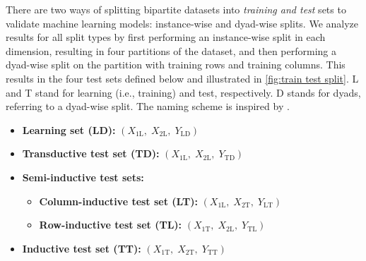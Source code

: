 \documentclass[letterpaper]{article}
\begin{document}
There are two ways of splitting bipartite datasets into \emph{training and test} sets to validate machine learning models: instance-wise and dyad-wise splits.
We analyze results for all split types by first performing an instance-wise split in each dimension, resulting in four partitions of the dataset, and then performing a dyad-wise split on the partition with training rows and training columns.
This results in the four test sets defined below and illustrated in \cref{fig:train test split}. L and T stand for learning (i.e., training) and test, respectively. D stands for dyads, referring to a dyad-wise split.
The naming scheme is inspired by \citet{schrynemackers_protocols_2013,pliakos_global_2018}.
\begin{itemize}
    \item \textbf{Learning set (LD):}
    $(X_\text{1L},\;X_\text{2L}, \;Y_\text{LD})$
    \item \textbf{Transductive test set (TD):}
    $(X_\text{1L},\;X_\text{2L}, \;Y_{\text{TD}})$
    \item \textbf{Semi-inductive test sets:}
    \begin{itemize}
        \item \textbf{Column-inductive test set (LT):}
            $
                (X_\text{1L},
                \;X_\text{2T},
                \;Y_\text{LT})
            $
        \item \textbf{Row-inductive test set (TL):}
            $
                (X_\text{1T},
                \;X_\text{2L},
                \;Y_\text{TL})
            $
    \end{itemize}
    \item \textbf{Inductive test set (TT):}
    $(
        X_\text{1T},
        \;X_\text{2T},
        \;Y_\text{TT}
    )$
\end{itemize}
\end{document}
